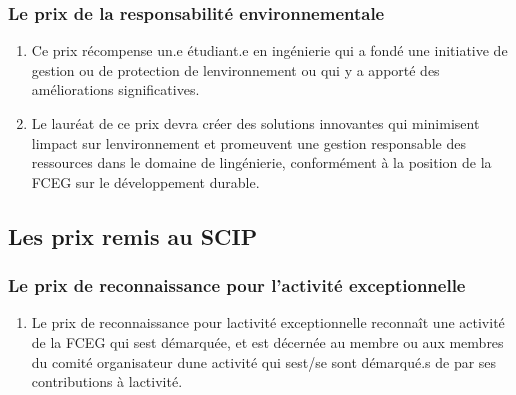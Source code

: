 \subsubsection{Le prix de la responsabilité environnementale}
\label{le-prix-de-la-responsabilite-environnementale}

\begin{enumerate}
 \item
  Ce prix récompense un.e étudiant.e en ingénierie qui a fondé une initiative de gestion ou de protection de l\textquotesingle environnement ou qui y a apporté des améliorations significatives.
 \item
  Le lauréat de ce prix devra créer des solutions innovantes qui minimisent l\textquotesingle impact sur l\textquotesingle environnement et promeuvent une gestion responsable des ressources dans le domaine de l\textquotesingle ingénierie, conformément à la position de la FCEG sur le développement durable.
\end{enumerate}

\subsection{Les prix remis au SCIP}
\label{les-prix-remis-au-scip}

\subsubsection{Le prix de reconnaissance pour l'activité exceptionnelle}
\label{le-prix-de-reconnaissance-pour-l-activite-exceptionnelle}

\begin{enumerate}
 \item
  Le prix de reconnaissance pour l\textquotesingle activité exceptionnelle reconnaît une activité de la FCEG qui s\textquotesingle est démarquée, et est décernée au membre ou aux membres du comité organisateur d\textquotesingle une activité qui s\textquotesingle est/se sont démarqué.s de par ses contributions à l\textquotesingle activité.
\end{enumerate}

